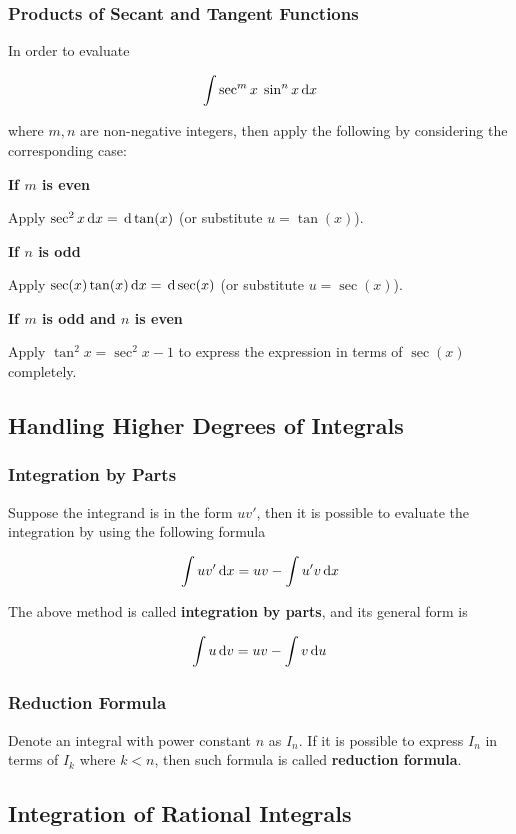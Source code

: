 \documentclass[a4paper,12pt]{article}
\begin{document}
\subsubsection{Products of Secant and Tangent Functions}
In order to evaluate

$$\int\sec^{m}x\;\sin^{n}x\,\mathrm{d} x$$\s

where $m,n$ are non-negative integers, then apply the following by considering the corresponding case:

\begin{alist}
  \item \textbf{If $m$ is even}\n

  Apply $\sec^{2}x\,\mathrm{d} x=\,\mathrm{d}\tan(x)$ (or substitute $u=\tan(x)$).

  \item \textbf{If $n$ is odd}\n

  Apply $\sec(x)\tan(x)\,\mathrm{d} x=\,\mathrm{d}\sec(x)$ (or substitute $u=\sec(x)$).

  \item \textbf{If $m$ is odd and $n$ is even}\n

  Apply $\tan^{2}x=\sec^{2}x-1$ to express the expression in terms of $\sec(x)$ completely.
\end{alist}

\subsection{Handling Higher Degrees of Integrals}
\subsubsection{Integration by Parts}
Suppose the integrand is in the form $uv'$, then it is possible to evaluate the integration by using the following formula

$$\int uv'\,\mathrm{d} x=uv-\int u'v\,\mathrm{d} x$$

The above method is called \textbf{integration by parts}, and its general form is

$$\int u\,\mathrm{d} v=uv-\int v\,\mathrm{d} u$$

\subsubsection{Reduction Formula}
Denote an integral with power constant $n$ as $I_{n}$. If it is possible to express $I_{n}$ in terms of $I_{k}$ where $k<n$, then such formula is called \textbf{reduction formula}.

\subsection{Integration of Rational Integrals}
\end{document}
